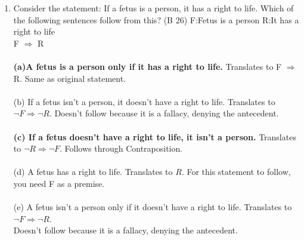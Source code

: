 \documentclass[]{article}
\begin{document}
\begin{enumerate}
    
    \item Consider the statement: If a fetus is a person, it has a right to life. Which of the following sentences follow from this? (B 26)
    \newline F:Fetus is a person
    \newline R:It has a right to life
    \\ F $\Rightarrow$ R
    \\\\\textbf{(a)A fetus is a person only if it has a right to life.}
    \newline Translates to F $\Rightarrow$ R.
    \newline Same as original statement.
    \\\\(b) If a fetus isn’t a person, it doesn’t have a right to life.
    \newline Translates to $\neg F \Rightarrow \neg R$.
    \newline Doesn't follow because it is a fallacy, denying the antecedent.
    \\\\ \textbf{(c) If a fetus doesn’t have a right to life, it isn’t a person.}
    \newline Translates to $\neg R \Rightarrow \neg F$.
    \newline Follows through Contraposition.
    \\\\(d) A fetus has a right to life.
    \newline Translates to $R$.
    \newline For this statement to follow, you need F as a premise.
    \\\\(e) A fetus isn’t a person only if it doesn’t have a right to life.
    \newline Translates to $\neg F \Rightarrow \neg R$.
    \\Doesn't follow because it is a fallacy, denying the antecedent.
    
    
    


\end{enumerate}
\end{document}
